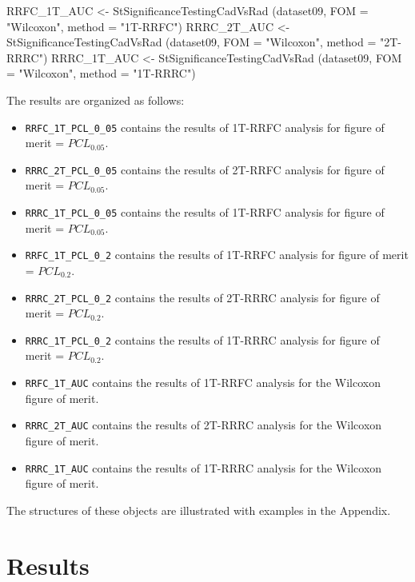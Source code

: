 \documentclass[
]{book}
\newenvironment{Shaded}{\begin{snugshade}}{\end{snugshade}}
\newcommand{\AttributeTok}[1]{\textcolor[rgb]{0.77,0.63,0.00}{#1}}
\newcommand{\FunctionTok}[1]{\textcolor[rgb]{0.00,0.00,0.00}{#1}}
\newcommand{\NormalTok}[1]{#1}
\newcommand{\OtherTok}[1]{\textcolor[rgb]{0.56,0.35,0.01}{#1}}
\newcommand{\StringTok}[1]{\textcolor[rgb]{0.31,0.60,0.02}{#1}}
\begin{document}
\begin{Shaded}
\begin{Highlighting}[]
\NormalTok{RRFC\_1T\_AUC }\OtherTok{\textless{}{-}} \FunctionTok{StSignificanceTestingCadVsRad}\NormalTok{ (dataset09, }
\AttributeTok{FOM =} \StringTok{"Wilcoxon"}\NormalTok{, }\AttributeTok{method =} \StringTok{"1T{-}RRFC"}\NormalTok{)}
\NormalTok{RRRC\_2T\_AUC }\OtherTok{\textless{}{-}} \FunctionTok{StSignificanceTestingCadVsRad}\NormalTok{ (dataset09, }
\AttributeTok{FOM =} \StringTok{"Wilcoxon"}\NormalTok{, }\AttributeTok{method =} \StringTok{"2T{-}RRRC"}\NormalTok{)}
\NormalTok{RRRC\_1T\_AUC }\OtherTok{\textless{}{-}} \FunctionTok{StSignificanceTestingCadVsRad}\NormalTok{ (dataset09, }
\AttributeTok{FOM =} \StringTok{"Wilcoxon"}\NormalTok{, }\AttributeTok{method =} \StringTok{"1T{-}RRRC"}\NormalTok{)}
\end{Highlighting}
\end{Shaded}

The results are organized as follows:

\begin{itemize}
\item
  \texttt{RRFC\_1T\_PCL\_0\_05} contains the results of 1T-RRFC analysis for figure of merit = \(PCL_{0.05}\).
\item
  \texttt{RRRC\_2T\_PCL\_0\_05} contains the results of 2T-RRFC analysis for figure of merit = \(PCL_{0.05}\).
\item
  \texttt{RRRC\_1T\_PCL\_0\_05} contains the results of 1T-RRFC analysis for figure of merit = \(PCL_{0.05}\).
\item
  \texttt{RRFC\_1T\_PCL\_0\_2} contains the results of 1T-RRFC analysis for figure of merit = \(PCL_{0.2}\).
\item
  \texttt{RRRC\_2T\_PCL\_0\_2} contains the results of 2T-RRRC analysis for figure of merit = \(PCL_{0.2}\).
\item
  \texttt{RRRC\_1T\_PCL\_0\_2} contains the results of 1T-RRRC analysis for figure of merit = \(PCL_{0.2}\).
\item
  \texttt{RRFC\_1T\_AUC} contains the results of 1T-RRFC analysis for the Wilcoxon figure of merit.
\item
  \texttt{RRRC\_2T\_AUC} contains the results of 2T-RRRC analysis for the Wilcoxon figure of merit.
\item
  \texttt{RRRC\_1T\_AUC} contains the results of 1T-RRRC analysis for the Wilcoxon figure of merit.
\end{itemize}

The structures of these objects are illustrated with examples in the Appendix.

\hypertarget{standalone-cad-radiologists-results}{%
\section{Results}\label{standalone-cad-radiologists-results}}
\end{document}
